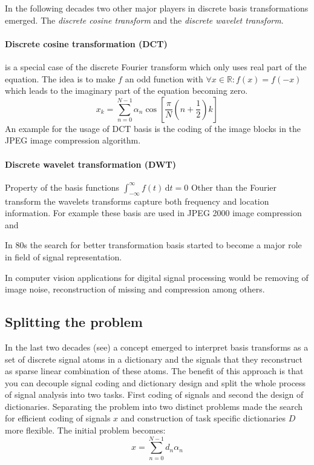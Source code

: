 In the following decades two other major players in discrete basis
transformations emerged. The \emph{discrete cosine transform} and the
\emph{discrete wavelet transform}.

\paragraph{Discrete cosine transformation (DCT)} is a special case of the
discrete Fourier transform which only uses real part of the equation. The idea
is to make $f$ an odd function with $\forall x \in \mathbb{R} : f(x) = f(-x)$
which leads to the imaginary part of the equation becoming zero.
\begin{equation*}
x_k = \sum_{n=0}^{N-1}\alpha_n\cos \left[ \frac{\pi}{N} \left(
n+\frac{1}{2}\right) k\right]
\end{equation*}
An example for the usage of DCT basis is the coding of the image blocks in the
JPEG image compression algorithm.


\paragraph{Discrete wavelet transformation (DWT)}
Property of the basis functions 
$\int_{-\infty}^{\infty} \! f(t) \, \mathrm{d}t = 0$
\Todo{}
Other than the Fourier transform the wavelets transforms capture both frequency
and location information. For example these basis are used in JPEG 2000 image
compression and 

In 80s the search for better transformation basis started to become a major role
in field of signal representation.\cite{} 


In computer vision applications for digital signal processing would be
removing of image noise, reconstruction of missing and compression among others.


\subsection{Splitting the problem}
\cite{Rubinstein2010}
In the last two decades (see\cite{Olshausen1996,Mallat1993}) a concept emerged
to interpret basis transforms as a set of discrete signal atoms in a dictionary
and the signals that they reconstruct as sparse linear combination of these
atoms. The benefit of this approach is that you can decouple signal coding and
dictionary design and split the whole process of signal analysis into two tasks.
First coding of signals and second the design of dictionaries. Separating the
problem into two distinct problems made the search for efficient coding of
signals $x$ and construction of task specific dictionaries $D$ more
flexible\cite{?}. The initial problem becomes:
\begin{equation}
x = \sum_{n=0}^{N-1}d_n\alpha_n
\end{equation}

